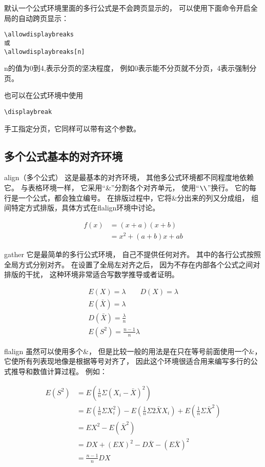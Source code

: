 \documentclass[b5paper,UTF8]{book}
\begin{document}
默认一个公式环境里面的多行公式是不会跨页显示的，
可以使用下面命令开启全局的自动跨页显示：
\begin{verbatim}
\allowdisplaybreaks
或
\allowdisplaybreaks[n]
\end{verbatim}
n的值为0到4,表示分页的坚决程度，
例如0表示能不分页就不分页，4表示强制分页。

也可以在公式环境中使用
\begin{verbatim}
\displaybreak 
\end{verbatim}

手工指定分页，它同样可以带有这个参数。

\subsection{多个公式基本的对齐环境}

align（多个公式）
这是最基本的对齐环境，
其他多公式环境都不同程度地依赖它。
与表格环境一样，
它采用“\&”分割各个对齐单元，
使用“$ \verb|\\|$”换行。
它的每行是一个公式，都会独立编号。
在排版过程中，它将\&分出来的列又分成组，
组间特定方式排版，具体方式在flalign环境中讨论。

\begin{align}
 f(x) &= (x+a)(x+b) \\
 &= x^2 + (a+b)x + ab
\end{align}

gather
它是最简单的多行公式环境，
自己不提供任何对齐。
其中的各行公式按照全局方式分别对齐。
在设置了全局左对齐之后，
因为不存在内部各个公式之间对排版的干扰，
这种环境非常适合写数学推导或者证明。

\begin{gather}
E(X)=\lambda	\qquad	D(X)=\lambda	\\
E(\bar{X})=\lambda	\\
D(\bar{X})=\frac{\lambda}{n}	\\
E(S^2)=\frac{n-1}{n}\lambda
\end{gather}



flalign
虽然可以使用多个\&，
但是比较一般的用法是在只在等号前面使用一个\&，
它使所有列表现地像是根据等号对齐了，
因此这个环境很适合用来编写多行的公式推导和数值计算过程。
例如：


\begin{align*}
E(S^2)	&=E\left(\frac{1}{n} \Sigma (X_i-\bar{X})^2\right)	\\
&	=E\left(\frac{1}{n}\Sigma X_i^2\right)
 - E\left(\frac{1}{n}\Sigma 2\bar{X}X_i\right)
 + E\left(\frac{1}{n}\Sigma \bar{X}^2\right)	\\
&	=EX^2 -E(\bar{X}^2)	\\
&	=DX + (EX)^2 - D\bar{X} - (E\bar{X})^2	\\
&	=\frac{n-1}{n}DX
\end{align*}
\end{document}
